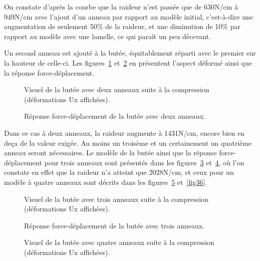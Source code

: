 ﻿\documentclass{article}
\begin{document}
On constate d'après la courbe que la raideur n'est passée que de 630N/cm à 949N/cm avec l'ajout d'un anneau par rapport au modèle initial, c'est-à-dire une augmentation de seulement 50\% de la raideur, et une diminution de 10\% par rapport au modèle avec une lamelle, ce qui paraît un peu décevant.

Un second anneau est ajouté à la butée, équitablement réparti avec le premier sur la hauteur de celle-ci. Les figures~\ref{fig31} et~\ref{fig32} en présentent l'aspect déformé ainsi que la réponse force-déplacement.

\begin{figure}[!h]
	\centering
	\caption{Visuel de la butée avec deux anneaux suite à la compression (déformations Ux affichées).}
	\label{fig31}
\end{figure}

\begin{figure}[!h]
	\centering
	\caption{Réponse force-déplacement de la butée avec deux anneaux.}
	\label{fig32}
\end{figure}

Dans ce cas à deux anneaux, la raideur augmente à 1431N/cm, encore bien en deça de la valeur exigée. Au moins un troisème et un certainement un quatrième anneau seront nécessaires. Le modèle de la butée ainsi que la réponse force-déplacement pour trois anneaux sont présentés dans les figures~\ref{fig33} et~\ref{fig34}, où l'on constate en effet que la raideur n'a atteint que 2028N/cm, et ceux pour un modèle à quatre anneaux sont décrits dans les figures~\ref{fig35} et~\ref{fig36}.

\begin{figure}[!h]
	\centering
	\caption{Visuel de la butée avec trois anneaux suite à la compression (déformations Ux affichées).}
	\label{fig33}
\end{figure}

\begin{figure}[!h]
	\centering
	\caption{Réponse force-déplacement de la butée avec trois anneaux.}
	\label{fig34}
\end{figure}

\begin{figure}[!h]
	\centering
	\caption{Visuel de la butée avec quatre anneaux suite à la compression (déformations Ux affichées).}
	\label{fig35}
\end{figure}
\end{document}
